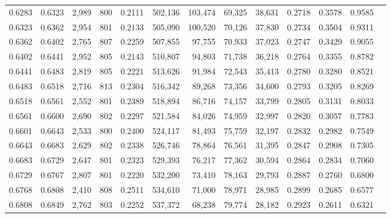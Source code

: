 \begin{tabular}{rrrrrrrrrrrrr}
0.6283 & 0.6323 &  2,989 &   800 &                                     0.2111 & 502,136 & 103,474 &  69,325 &  38,631 & 0.2718 & 0.3578 & 0.9585 \\
0.6323 & 0.6362 &  2,954 &   801 &                                     0.2133 & 505,090 & 100,520 &  70,126 &  37,830 & 0.2734 & 0.3504 & 0.9311 \\
0.6362 & 0.6402 &  2,765 &   807 &                                     0.2259 & 507,855 &  97,755 &  70,933 &  37,023 & 0.2747 & 0.3429 & 0.9055 \\
0.6402 & 0.6441 &  2,952 &   805 &                                     0.2143 & 510,807 &  94,803 &  71,738 &  36,218 & 0.2764 & 0.3355 & 0.8782 \\
0.6441 & 0.6483 &  2,819 &   805 &                                     0.2221 & 513,626 &  91,984 &  72,543 &  35,413 & 0.2780 & 0.3280 & 0.8521 \\
0.6483 & 0.6518 &  2,716 &   813 &                                     0.2304 & 516,342 &  89,268 &  73,356 &  34,600 & 0.2793 & 0.3205 & 0.8269 \\
0.6518 & 0.6561 &  2,552 &   801 &                                     0.2389 & 518,894 &  86,716 &  74,157 &  33,799 & 0.2805 & 0.3131 & 0.8033 \\
0.6561 & 0.6600 &  2,690 &   802 &                                     0.2297 & 521,584 &  84,026 &  74,959 &  32,997 & 0.2820 & 0.3057 & 0.7783 \\
0.6601 & 0.6643 &  2,533 &   800 &                                     0.2400 & 524,117 &  81,493 &  75,759 &  32,197 & 0.2832 & 0.2982 & 0.7549 \\
0.6643 & 0.6683 &  2,629 &   802 &                                     0.2338 & 526,746 &  78,864 &  76,561 &  31,395 & 0.2847 & 0.2908 & 0.7305 \\
0.6683 & 0.6729 &  2,647 &   801 &                                     0.2323 & 529,393 &  76,217 &  77,362 &  30,594 & 0.2864 & 0.2834 & 0.7060 \\
0.6729 & 0.6767 &  2,807 &   801 &                                     0.2220 & 532,200 &  73,410 &  78,163 &  29,793 & 0.2887 & 0.2760 & 0.6800 \\
0.6768 & 0.6808 &  2,410 &   808 &                                     0.2511 & 534,610 &  71,000 &  78,971 &  28,985 & 0.2899 & 0.2685 & 0.6577 \\
0.6808 & 0.6849 &  2,762 &   803 &                                     0.2252 & 537,372 &  68,238 &  79,774 &  28,182 & 0.2923 & 0.2611 & 0.6321 \\

\end{tabular}
